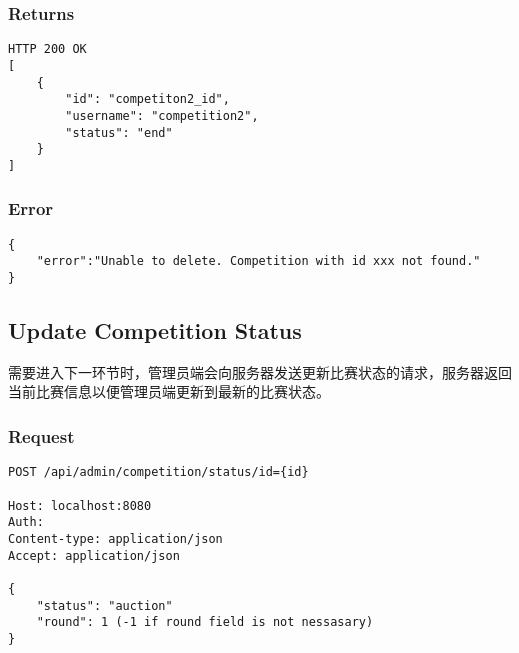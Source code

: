 \documentclass{article}
\begin{document}
\subsubsection*{Returns}
\begin{lstlisting}
HTTP 200 OK
[
	{
	    "id": "competiton2_id",
	    "username": "competition2",
	    "status": "end"
	}
]
\end{lstlisting}

\subsubsection*{Error}
\begin{lstlisting}
{
    "error":"Unable to delete. Competition with id xxx not found."
}
\end{lstlisting}

\subsection{Update Competition Status}

需要进入下一环节时，管理员端会向服务器发送更新比赛状态的请求，服务器返回当前比赛信息以便管理员端更新到最新的比赛状态。

\subsubsection*{Request}
\begin{lstlisting}
POST /api/admin/competition/status/id={id}

Host: localhost:8080
Auth:
Content-type: application/json
Accept: application/json

{
	"status": "auction"
	"round": 1 (-1 if round field is not nessasary)
}
\end{lstlisting}
\end{document}
